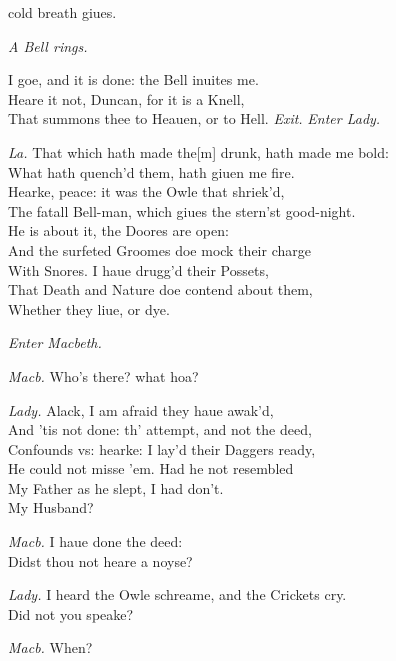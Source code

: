 \documentclass[12pt]{sides}
\newcommand{\clStageDir}[1]{\hspace*{\fill}\textit{#1}\hspace*{\fill}}
\newcommand{\elStageDir}[1]{\hfill\textit{#1}}
\newcommand{\dia}[1]{\hskip 15pt\textit{#1}\hskip 6pt}
\begin{document}
\begin{multicols}{2}
cold breath giues.

            \elStageDir{A Bell rings.} \hspace{75pt}

            I goe, and it is done: the Bell inuites me. \\ Heare it not, Duncan, for it is a Knell, \\ That summons thee to Heauen, or to Hell. \elStageDir{Exit.} \hspace{8pt} %
            \clStageDir{Enter Lady.}
            
            \dia{La.} That which hath made the[m] drunk, hath made me bold: \\ What hath quench'd them, hath giuen me fire. \\ Hearke, peace: it was the Owle that shriek'd, \\ The fatall Bell-man, which giues the stern'st good-night. \\ He is about it, the Doores are open: \\ And the surfeted Groomes doe mock their charge \\ With Snores. I haue drugg'd their Possets, \\ That Death and Nature doe contend about them, \\ Whether they liue, or dye.
            
            \clStageDir{Enter Macbeth.}
            
            \dia{Macb.} Who's there? what hoa?

            \dia{Lady.} Alack, I am afraid they haue awak'd, \\ And 'tis not done: th' attempt, and not the deed, \\ Confounds vs: hearke: I lay'd their Daggers ready, \\ He could not misse 'em. Had he not resembled \\ My Father as he slept, I had don't. \\ My Husband?

            \dia{Macb.} I haue done the deed: \\ Didst thou not heare a noyse?

            \dia{Lady.} I heard the Owle schreame, and the Crickets cry. \\ Did not you speake?

            \dia{Macb.} When?


\end{multicols}
\end{document}
